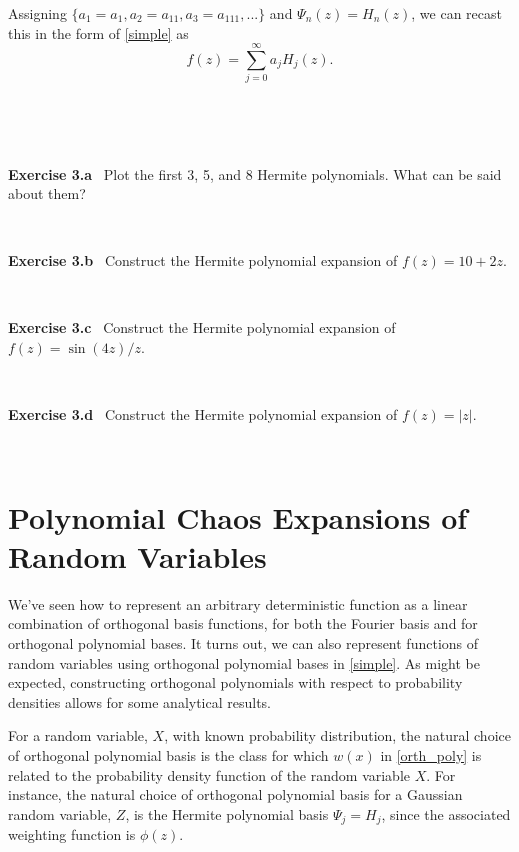 \documentclass[11pt]{article}
\numberwithin{equation}{section}
\begin{document}
Assigning $\{a_1 = a_1, a_2 = a_{11}, a_3 = a_{111}, ...\}$ and $\Psi_n(z) = H_n(z)$, we can recast this in the form of \eqref{simple} as
\begin{equation}
f(z) = \sum_{j=0}^{\infty} a_j H_j(z).
\end{equation}



\

\

\textbf{Exercise 3.a} \ Plot the first 3, 5, and 8 Hermite polynomials. What can be said about them?

\

\textbf{Exercise 3.b} \ Construct the Hermite polynomial expansion of $f(z) = 10 + 2z$.

\

\textbf{Exercise 3.c} \ Construct the Hermite polynomial expansion of $f(z) = \sin(4z)/z$.

\

\textbf{Exercise 3.d} \ Construct the Hermite polynomial expansion of $f(z) = |z|$.

\







\section{Polynomial Chaos Expansions of Random Variables}

We've seen how to represent an arbitrary deterministic function as a linear combination of orthogonal basis functions, for both the Fourier basis and for orthogonal polynomial bases. It turns out, we can also represent functions of random variables using orthogonal polynomial bases in \eqref{simple}. As might be expected, constructing orthogonal polynomials with respect to probability densities allows for some analytical results.

\qquad For a random variable, $X$, with known probability distribution, the natural choice of orthogonal polynomial basis is the class for which $w(x)$ in \eqref{orth_poly} is related to the probability density function of the random variable $X$. For instance, the natural choice of orthogonal polynomial basis for a Gaussian random variable, $Z$,  is the Hermite polynomial basis $\Psi_j = H_j$, since the associated weighting function is $\phi(z)$.



\

\
\end{document}
